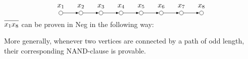 \[
  \begin{tikzpicture}
    [
    point/.style={circle,draw,inner sep=0pt,minimum size=2mm},
    collection/.style={thick,rectangle,draw,inner sep=0pt,minimum height=14mm, minimum width= 9mm}
    ]
    \node (1) at (0,1) [point,label=above:$x_1$] {};
    \node (2) at (1,1) [point,label=above:$x_2$] {};
    \node (3) at (2,1) [point,label=above:$x_3$] {};
    \node (4) at (3,1) [point,label=above:$x_4$] {};
    \node (5) at (4,1) [point,label=above:$x_5$] {};
    \node (6) at (5,1) [point,label=above:$x_6$] {};
    \node (7) at (6,1) [point,label=above:$x_7$] {};
    \node (8) at (7,1) [point,label=above:$x_8$] {};
    \draw [-latex] (1) to (2);
    \draw [-latex] (2) to (3);
    \draw [-latex] (3) to (4);
    \draw [-latex] (4) to (5);
    \draw [-latex] (5) to (6);
    \draw [-latex] (6) to (7);
    \draw [-latex] (7) to (8);
  \end{tikzpicture}
\]
$\ol{x_1x_8}$ can be proven in Neg in the following way:
\begin{prooftree*}
\end{prooftree*}
More generally, whenever two vertices are connected by a path of odd length, their corresponding NAND-clause is provable.
